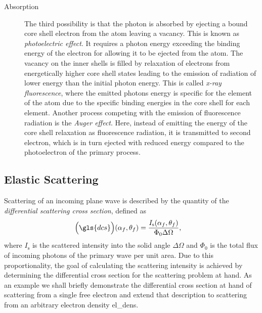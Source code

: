\begin{description}
       \item[Absorption]
          {The third possibility is that the photon is absorbed by ejecting a bound core shell electron from the atom leaving a vacancy. This is known as \emph{photoelectric effect}. It requires a photon energy exceeding the binding energy of the electron for allowing it to be ejected from the atom. The vacancy on the inner shells is filled by relaxation of electrons from energetically higher core shell states leading to the emission of radiation of lower energy than the initial photon energy. This is called \emph{x-ray fluorescence}, where the emitted photons energy is specific for the element of the atom due to the specific binding energies in the core shell for each element. Another process competing with the emission of fluorescence radiation is the \emph{Auger effect}. Here, instead of emitting the energy of the core shell relaxation as fluorescence radiation, it is transmitted to second electron, which is in turn ejected with reduced energy compared to the photoelectron of the primary process.}
\end{description}

\subsection{Elastic Scattering} \label{ch_theo:sec_elastic_scattering}
Scattering of an incoming plane wave is described by the quantity of the \emph{differential scattering cross section}, defined as
\begin{align}
\Big(\gls{dcs}\Big)(\alpha_f, \theta_f) &= \frac{I_\text{s}(\alpha_f, \theta_f)}{\Phi_0 \Delta \Omega}\text{,}
\end{align}
where $I_\text{s}$ is the scattered intensity into the solid angle $\Delta \Omega$ and $\Phi_0$ is the total flux of incoming photons of the primary wave per unit area. Due to this proportionality, the goal of calculating the scattering intensity is achieved by determining the differential cross section for the scattering problem at hand. As an example we shall briefly demonstrate the differential cross section at hand of scattering from a single free electron and extend that description to scattering from an arbitrary electron density \gls{el_dens}.

